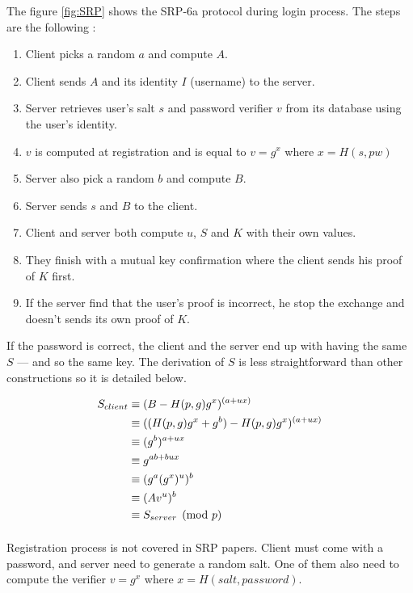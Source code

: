 \documentclass[../report.tex]{subfiles}
\begin{document}
The figure \ref{fig:SRP} shows the SRP-6a\cite{http://srp.stanford.edu/design.html} protocol during login process.
The steps are the following :

\begin{enumerate}
 \item Client picks a random $a$ and compute $A$.
 \item Client sends $A$ and its identity $I$ (username) to the server.
 \item Server retrieves user's salt $s$ and password verifier $v$ from its database using the user's identity.
 \item $v$ is computed at registration and is equal to $v = g^x$ where $x = H(s, pw)$
 \item Server also pick a random $b$ and compute $B$.
 \item Server sends $s$ and $B$ to the client.
 \item Client and server both compute $u$, $S$ and $K$ with their own values.
 \item They finish with a mutual key confirmation where the client sends his proof of $K$ first.
 \item If the server find that the user's proof is incorrect, he stop the exchange and doesn't sends its own proof of $K$.
\end{enumerate}

If the password is correct, the client and the server end up with having the same $S$ --- and so the same key. The derivation of $S$ is less straightforward than other constructions so it is detailed below.

\begin{align*}
 S_{client}
 &\equiv (B - H(p, g) g^x)^{(a+ux)}\notag\\
 &\equiv ((H(p, g) g^x + g^b) - H(p, g) g^x)^{(a+ux)}\notag\\
 &\equiv (g^b)^{a+ux}\notag\\
 &\equiv g^{ab+bux}\notag\\
 &\equiv (g^a (g^x)^u)^b\notag\\
 &\equiv (Av^u)^b\notag\\
 &\equiv S_{server} \pmod{p}
\end{align*}

\paragraph{}
Registration process is not covered in SRP papers.
Client must come with a password, and server need to generate a random salt. One of them also need to compute the verifier $v = g^x$ where $x = H(salt, password)$.
\end{document}
